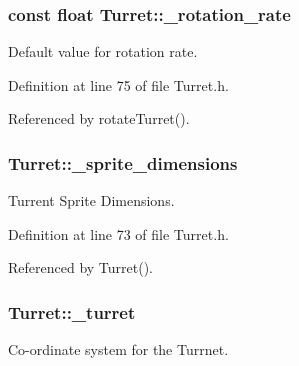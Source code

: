 \hypertarget{classTurret_abd03fe34cbb67d081002b4fa3b60be71}{
\subsubsection[{\-\_\-rotation\-\_\-rate}]{\setlength{\rightskip}{0pt plus 5cm}const float Turret\-::\-\_\-rotation\-\_\-rate\hspace{0.3cm}{\ttfamily [private]}}}\label{classTurret_abd03fe34cbb67d081002b4fa3b60be71}


Default value for rotation rate. 



Definition at line 75 of file Turret.\-h.



Referenced by rotate\-Turret().

\hypertarget{classTurret_aca4002cdadaf5f3e9ae210ba5d2e7244}{
\subsubsection[{\-\_\-sprite\-\_\-dimensions}]{ Turret\-::\-\_\-sprite\-\_\-dimensions\hspace{0.3cm}{\ttfamily [private]}}}\label{classTurret_aca4002cdadaf5f3e9ae210ba5d2e7244}


Turrent Sprite Dimensions. 



Definition at line 73 of file Turret.\-h.



Referenced by Turret().

\hypertarget{classTurret_a71caf1801690ed81facba1f4cc99defd}{
\subsubsection[{\-\_\-turret}]{ Turret\-::\-\_\-turret\hspace{0.3cm}{\ttfamily [private]}}}\label{classTurret_a71caf1801690ed81facba1f4cc99defd}


Co-\/ordinate system for the Turrnet. 



